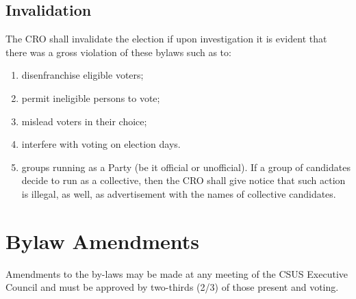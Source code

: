 \subsection{Invalidation}\label{invalidation}

The CRO shall invalidate the election if upon investigation it is
evident that there was a gross violation of these bylaws such as to:

\begin{enumerate}
\def\labelenumi{\arabic{enumi}.}
\item
  disenfranchise eligible voters;
\item
  permit ineligible persons to vote;
\item
  mislead voters in their choice;
\item
  interfere with voting on election days.
\item
  groups running as a Party (be it official or unofficial). If a group
  of candidates decide to run as a collective, then the CRO shall give
  notice that such action is illegal, as well, as advertisement with the
  names of collective candidates.
\end{enumerate}

\section{Bylaw Amendments}\label{bylaw-amendments}

Amendments to the by-laws may be made at any meeting of the CSUS
Executive Council and must be approved by two-thirds (2/3) of those
present and voting.
